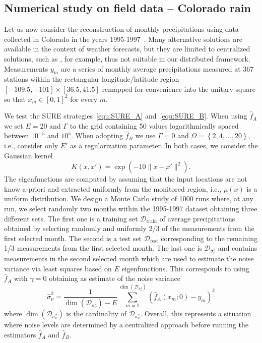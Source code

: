 \documentclass[10pt,twocolumn,twoside]{IEEEtran}					%
\theoremstyle	{plain}
\begin{document}
\subsection{Numerical study on field data -- Colorado rain}
\label{sec:numerical_assessments_meteorology}

Let us now consider the reconstruction of monthly precipitations using data collected in Colorado in the years 1995-1997~\cite{coloradorain}. Many alternative solutions are available in the context of weather forecasts, but they are limited to centralized solutions, such as \cite{Gelfand:05,Datta:16}, for example, thus not suitable in our distributed framework. Measurements $y_{m}$ are a series of monthly average precipitations measured at 367 stations within the rectangular longitude/latitude region $[-109.5,-101] \times [36.5,41.5]$ remapped for convenience into the unitary square so that $x_{m} \in [0, 1]^{2}$ for every $m$.

We test the \ac{SURE} strategies~\eqref{equ:SURE_A} and~\eqref{equ:SURE_B}. When using $\widehat{f}_{A}$ we set $E = 20$ and $\Gamma$ to the grid containing 50 values logarithmically spaced between $10^{-5}$ and $10^{5}$. When adopting $\widehat{f}_{B}$ we use $\Gamma = 0$ and $\Omega = \left\{ 2, 4, \ldots, 20 \right\}$, i.e., consider only $E'$ as a regularization parameter. In both cases, we consider the Gaussian kernel
%
\begin{equation}
	K(x,x') = \exp \left( - 10 \| x - x' \|^{2} \right).
\end{equation}
%
The eigenfunctions are computed by assuming that the input locations are not know a-priori and extracted uniformly from the monitored region, i.e., $\mu(x)$ is a uniform distribution. We design a Monte Carlo study of 1000 runs where, at any run, we select randomly two months within the 1995-1997 dataset obtaining three different sets. The first one is a training set $\mathcal{D}_{\textrm{train}}$ of average precipitations obtained by selecting randomly and uniformly 2/3 of the measurements from the first selected month. The second is a test set $\mathcal{D}_{\textrm{test}}$ corresponding to the remaining 1/3 measurements from the first selected month. The last one is $\mathcal{D}_{\sigma_{\nu}^{2}}$ and contains measurements in the second selected month which are used to estimate the noise variance via least squares based on $E$ eigenfunctions. This corresponds to using $\widehat{f}_{A}$ with $\gamma=0$ obtaining as estimate of the noise variance 
%
\begin{equation}
	\widehat{\sigma}_{\nu}^{2}
	=
	\frac{1}{\dim(\mathcal{D}_{\sigma_{\nu}^{2}})-E}
	\sum_{m = 1}^{\dim(\mathcal{D}_{\sigma_{\nu}^{2}})} \left( \widehat{f}_{A} \left( x_{m} ; 0 \right) - y_{m} \right)^{2}
	\label{equ:estimate-variance-of-noise}
\end{equation}
%
where $\dim(\mathcal{D}_{\sigma_{\nu}^{2}})$ is the cardinality of $\mathcal{D}_{\sigma_{\nu}^{2}}$. Overall, this represents a situation where noise levels are determined by a centralized approach before running the estimators $\widehat{f}_{A}$ and $\widehat{f}_{B}$.
\end{document}
